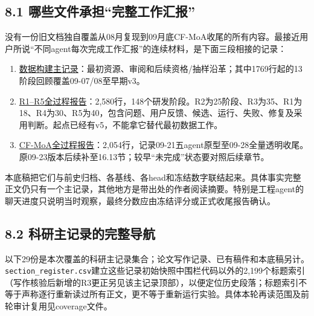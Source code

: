\documentclass[
  11pt,
  a4paper,
]{article}
\providecommand{\tightlist}{%
  \setlength{\itemsep}{0pt}\setlength{\parskip}{0pt}}
\begin{document}
\subsection{8.1
哪些文件承担``完整工作汇报''}\label{ux54eaux4e9bux6587ux4ef6ux627fux62c5ux5b8cux6574ux5de5ux4f5cux6c47ux62a5}

没有一份旧文档独自覆盖从08月复现到09月底CF-MoA收尾的所有内容。最接近用户所说``不同agent每次完成工作汇报''的连续材料，是下面三段相接的记录：

\begin{enumerate}
\def\labelenumi{\arabic{enumi}.}
\tightlist
\item
  \href{https://github.com/xiotakut/cf_mrg/blob/main/papers/2026-10-02_cf_moa/author_dossier/records/data/construction.md}{数据构建主记录}：最初资源、审阅和后续资格/抽样沿革；其中1769行起的13阶段回顾覆盖09-07/08至早期v3。
\item
  \href{https://github.com/xiotakut/cf_mrg/blob/main/papers/2026-10-02_cf_moa/author_dossier/records/research/support_update_experiment_report.md}{R1--R5全过程报告}：2,580行，148个研发阶段。R2为25阶段、R3为35、R1为18、R4为30、R5为40，包含问题、用户反馈、候选、运行、失败、修复及采用判断。起点已经有v5，不能拿它替代最初数据工作。
\item
  \href{https://github.com/xiotakut/cf_mrg/blob/main/papers/2026-10-02_cf_moa/author_dossier/records/research/cf_moa_experiment_report.md}{CF-MoA全过程报告}：2,054行，记录09-21五agent原型至09-28全量透明收尾。原09-23版本后续补至16.13节；较早``未完成''状态要对照后续章节。
\end{enumerate}

本底稿把它们与前史归档、各基线、各head和冻结数字联结起来。具体事实完整正文仍只有一个主记录，其他地方是带出处的作者阅读摘要。特别是工程agent的聊天进度只说明当时观察，最终分数应由冻结评分或正式收尾报告确认。

\subsection{8.2
科研主记录的完整导航}\label{ux79d1ux7814ux4e3bux8bb0ux5f55ux7684ux5b8cux6574ux5bfcux822a}

以下29份是本次覆盖的科研主记录集合；论文写作记录、已有稿件和本底稿另计。\texttt{section\_\allowbreak{}register.\allowbreak{}csv}建立这些记录初始快照中围栏代码以外的2,199个标题索引（写作核验后新增的R3更正另见该主记录顶部），以便定位历史段落；标题索引不等于声称逐行重新读过所有正文，更不等于重新运行实验。具体本轮再读范围及前轮审计复用见coverage文件。
\end{document}
